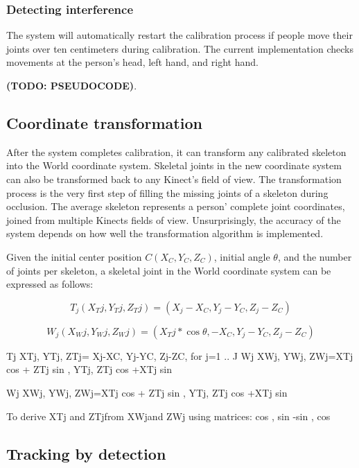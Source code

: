 \documentclass{sigchi}
\begin{document}
\subsubsection{Detecting interference}

The system will automatically restart the calibration process if people move their joints over ten centimeters during calibration. The current implementation checks movements at the person's head, left hand, and right hand.

\textbf{(TODO: PSEUDOCODE)}. 

\subsection{Coordinate transformation}

After the system completes calibration, it can transform any calibrated skeleton into the World coordinate system. Skeletal joints in the new coordinate system can also be transformed back to any Kinect's field of view. The transformation process is the very first step of filling the missing joints of a skeleton during occlusion. The average skeleton represents a person' complete joint coordinates, joined from multiple Kinects fields of view. Unsurprisingly, the accuracy of the system depends on how well the transformation algorithm is implemented.

Given the initial center position $C(X_C, Y_C, Z_C)$, initial angle $\theta$, and the number of joints per skeleton, a skeletal joint in the World coordinate system can be expressed as follows:

\begin{equation}
\label{eq:transformed_j}
T_j (X_Tj, Y_Tj, Z_Tj) = (X_j - X_C, Y_j - Y_C, Z_j - Z_C)
\end{equation}

\begin{equation}
\label{eq:worldview_j}
W_j (X_Wj, Y_Wj, Z_Wj) = (X_Tj * \cos \theta, - X_C, Y_j - Y_C, Z_j - Z_C)
\end{equation}

Tj XTj, YTj, ZTj= Xj-XC, Yj-YC, Zj-ZC, for j=1 .. J
Wj XWj, YWj, ZWj=XTj cos  + ZTj sin , YTj, ZTj cos  +XTj sin 

Wj XWj, YWj, ZWj=XTj cos  + ZTj sin , YTj, ZTj cos  +XTj sin 

To derive XTj and ZTjfrom XWjand ZWj using matrices:
cos , sin    
-sin , cos 

\subsection{Tracking by detection}
\end{document}
